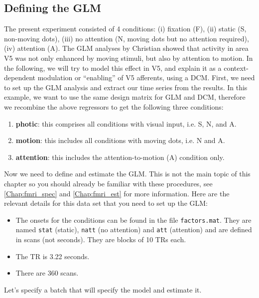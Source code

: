 \subsection{Defining the GLM}
The present experiment consisted of 4 conditions: (i) fixation (F), (ii) static (S, non-moving dots), (iii) no attention (N, moving dots but no attention required), (iv) attention (A). The GLM analyses by Christian showed that activity in area V5 was not only enhanced by moving stimuli, but also by attention to motion.  In the following, we will try to model this effect in V5, and explain it as a context-dependent modulation or ``enabling'' of V5 afferents, using a DCM. First, we need to set up the GLM analysis and extract our time series from the results. In this example, we want to use the same design matrix for GLM and DCM, therefore we recombine the above regressors to get the following three conditions:
\begin{enumerate}
 \item \textbf{photic}: this comprises all conditions with visual input, i.e. S, N, and A.
 \item \textbf{motion}: this includes all conditions with moving dots, i.e. N and A.
 \item \textbf{attention}: this includes the attention-to-motion (A) condition only.
\end{enumerate}
Now we need to define and estimate the GLM. This is not the main topic of this chapter so you should already be familiar with these procedures, see \ref{Chap:fmri_spec} and \ref{Chap:fmri_est} for more information. Here are the relevant details for this data set that you need to set up the GLM:
\begin{itemize}
 \item The onsets for the conditions can be found in the file \texttt{factors.mat}. They are named \texttt{stat} (static), \texttt{natt} (no attention) and \texttt{att} (attention) and are defined in scans (not seconds). They are blocks of 10 TRs each.
 \item The TR is 3.22 seconds.
 \item There are 360 scans.
\end{itemize}

Let's specify a batch that will specify the model and estimate it.

